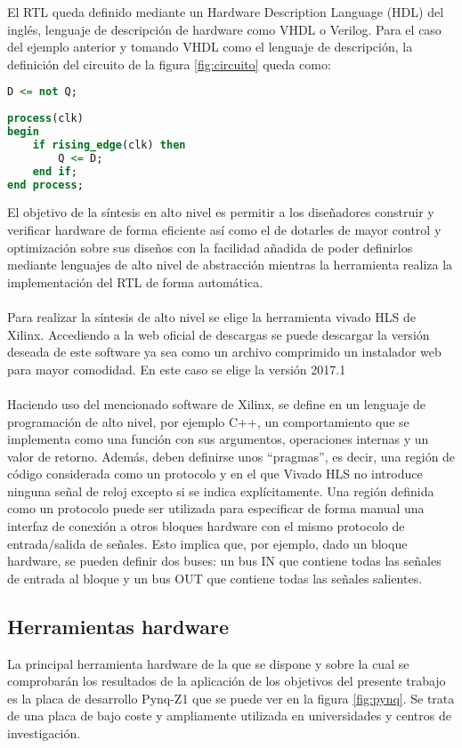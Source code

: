 El RTL queda definido mediante un Hardware Description Language (HDL) del inglés, lenguaje de descripción de hardware como VHDL o Verilog. Para el caso del ejemplo anterior y tomando VHDL como el lenguaje de descripción, la definición del circuito de la figura \ref{fig:circuito} queda como:

\begin{lstlisting}[language=VHDL,breaklines]
D <= not Q;
 
process(clk)
begin
    if rising_edge(clk) then
        Q <= D;
    end if;
end process;
\end{lstlisting}


El objetivo de la síntesis en alto nivel es permitir a los diseñadores construir y verificar hardware de forma eficiente así como el de dotarles de mayor control y optimización sobre sus diseños con la facilidad añadida de poder definirlos mediante lenguajes de alto nivel de abstracción mientras la herramienta realiza la implementación del RTL de forma automática.
\\
\\
Para realizar la síntesis de alto nivel se elige la herramienta vivado HLS de Xilinx. Accediendo a la web oficial de descargas\cite{vivado_descarga} se puede descargar la versión deseada de este software ya sea como un archivo comprimido un instalador web para mayor comodidad. En este caso se elige la versión 2017.1
\\
\\
Haciendo uso del mencionado software de Xilinx, se define en un lenguaje de programación de alto nivel, por ejemplo C++, un comportamiento que se implementa como una función con sus argumentos, operaciones internas y un valor de retorno. Además, deben definirse unos ``pragmas'', es decir, una región de código considerada como un protocolo y en el que Vivado HLS no introduce ninguna señal de reloj excepto si se indica explícitamente. Una región definida como un protocolo puede ser utilizada para especificar de forma manual una interfaz de conexión a otros bloques hardware con el mismo protocolo de entrada/salida de señales. Esto implica que, por ejemplo, dado un bloque hardware, se pueden definir dos buses: un bus IN que contiene todas las señales de entrada al bloque y un bus OUT que contiene todas las señales salientes.



\subsection{Herramientas hardware} \label{herraminetas_hardware}
La principal herramienta hardware de la que se dispone y sobre la cual se comprobarán los resultados de la aplicación de los objetivos del presente trabajo es la placa de desarrollo Pynq-Z1\cite{pynq} que se puede ver en la figura \ref{fig:pynq}. Se trata de una placa de bajo coste y ampliamente utilizada en universidades y centros de investigación.

